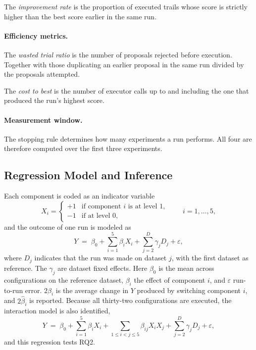 \documentclass[11pt]{article}
\begin{document}
The \emph{improvement rate} is the proportion of executed trails whose score is strictly higher than the best score earlier in the same run.

\paragraph{Efficiency metrics.} The \emph{wasted trial ratio} is the number of proposals rejected before execution. Together with those duplicating an earlier proposal in the same run divided by the proposals attempted.

The \emph{cost to best} is the number of executor calls up to and including the one that produced the run's highest score.

\paragraph{Measurement window.} The stopping rule determines how many experiments a run performs. All four are therefore computed over the first three experiments.

\subsection{Regression Model and Inference}

Each component is coded as an indicator variable
\begin{equation}
X_i = \begin{cases} +1 & \text{if component } i \text{ is at level } 1,\\ -1 & \text{if at level } 0,\end{cases}
\qquad i = 1,\ldots,5,
\label{eq:coding}
\end{equation}
and the outcome of one run is modeled as
\begin{equation}
Y \;=\; \beta_0 + \sum_{i=1}^{5}\beta_i X_i + \sum_{j=2}^{D}\gamma_j D_j + \varepsilon ,
\label{eq:regression}
\end{equation}
where $D_j$ indicates that the run was made on dataset $j$, with the first dataset as reference. The $\gamma_j$ are dataset fixed effects. Here $\beta_0$ is the mean across configurations on the reference dataset, $\beta_i$ the effect of component $i$, and $\varepsilon$ run-to-run error. $2\beta_i$ is the average change in $Y$ produced by switching component $i$, and $2\hat\beta_i$ is reported. Because all thirty-two configurations are executed, the interaction model is also identified,
\begin{equation}
Y \;=\; \beta_0 + \sum_{i=1}^{5}\beta_i X_i + \sum_{1\le i<j\le 5}\beta_{ij}X_iX_j + \sum_{j=2}^{D}\gamma_j D_j + \varepsilon ,
\label{eq:interaction}
\end{equation}
and this regression tests RQ2.
\end{document}
